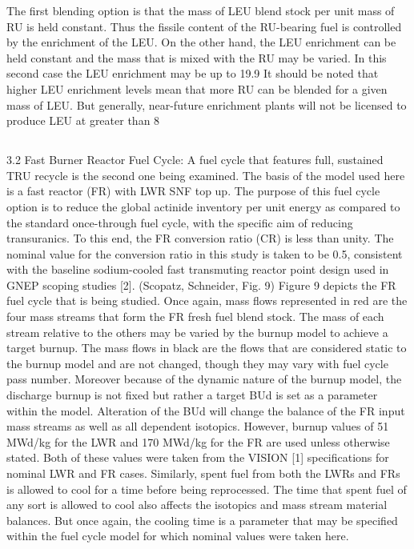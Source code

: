 The first blending option is that the mass of LEU blend stock per unit mass of RU is held constant.  Thus the fissile content of the RU-bearing fuel is controlled by the enrichment of the LEU.  On the other hand, the LEU enrichment can be held constant and the mass that is mixed with the RU may be varied.  In this second case the LEU enrichment may be up to 19.9%
It should be noted that higher LEU enrichment levels mean that more RU can be blended for a given mass of LEU.  But generally, near-future enrichment plants will not be licensed to produce LEU at greater than 8%



\subsection{}
\label{1g_sec:}
3.2 Fast Burner Reactor Fuel Cycle:
A fuel cycle that features full, sustained TRU recycle is the second one being examined.  The basis of the model used here is a fast reactor (FR) with LWR SNF top up.  The purpose of this fuel cycle option is to reduce the global actinide inventory per unit energy as compared to the standard once-through fuel cycle, with the specific aim of reducing transuranics.   To this end, the FR conversion ratio (CR) is less than unity.  The nominal value for the conversion ratio in this study is taken to be 0.5, consistent with the baseline sodium-cooled fast transmuting reactor point design used in GNEP scoping studies [2].  
(Scopatz, Schneider, Fig. 9)
Figure 9 depicts the FR fuel cycle that is being studied.  Once again, mass flows represented in red are the four mass streams that form the FR fresh fuel blend stock.  The mass of each stream relative to the others may be varied by the burnup model to achieve a target burnup.  The mass flows in black are the flows that are considered static to the burnup model and are not changed, though they may vary with fuel cycle pass number.  
Moreover because of the dynamic nature of the burnup model, the discharge burnup is not fixed but rather a target BUd is set as a parameter within the model.  Alteration of the BUd will change the balance of the FR input mass streams as well as all dependent isotopics.  However, burnup values of 51 MWd/kg for the LWR and 170 MWd/kg for the FR are used unless otherwise stated.  Both of these values were taken from the VISION [1] specifications for nominal LWR and FR cases.  Similarly, spent fuel from both the LWRs and FRs is allowed to cool for a time before being reprocessed.  The time that spent fuel of any sort is allowed to cool also affects the isotopics and mass stream material balances.  But once again, the cooling time is a parameter that may be specified within the fuel cycle model for which nominal values were taken here.
